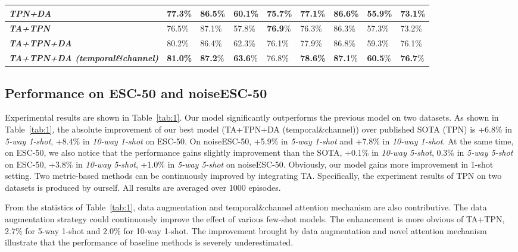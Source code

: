 \documentclass[a4paper]{article}
\begin{document}
\begin{table}[t]
{\begin{tabular}{l|l|l|l|l|l|l|l|l}
		\midrule
		{\textbf{\textit{TPN+DA}}} & 77.3\%  & 86.5\%  & 60.1\%  & 75.7\% & 77.1\% & 86.6\% & 55.9\%  & 73.1\%  \\
		\midrule
		{\textbf{\textit{TA+TPN}}} & 76.5\%  & 87.1\%  & 57.8\%  & \textbf{76.9}\% & 76.3\% & 86.3\% & 57.3\%  & 73.2\%  \\
		\midrule
		{\textbf{\textit{TA+TPN+DA}}} & 80.2\%  & 86.4\%  & 62.3\%  & 76.1\% & 77.9\%  & 86.8\%  & 59.3\%  & 76.1\%  \\
		\midrule
		{\textbf{\textit{TA+TPN+DA (temporal\&channel)}}} & \textbf{81.0\%}  & \textbf{87.2}\%  & \textbf{63.6}\%  & 76.8\% & \textbf{78.6\%}  & \textbf{87.1}\%  & \textbf{60.5}\%  & \textbf{76.7}\%  \\
		\bottomrule
		\end{tabular}
	}
\vspace{-2mm}
\end{table}

\vspace{-1mm}
\subsection{Performance on ESC-50 and noiseESC-50}
\vspace{-1mm}
Experimental results are shown in Table~\ref{tab:1}. Our model significantly outperforms the previous model on two datasets. As shown in Table~\ref{tab:1}, the absolute improvement of our best model (TA+TPN+DA (temporal\&channel)) over published SOTA (TPN) is +6.8\% in \textit{5-way 1-shot}, +8.4\% in \textit{10-way 1-shot} on ESC-50. On noiseESC-50, +5.9\% in \textit{5-way 1-shot} and +7.8\% in \textit{10-way 1-shot}.
At the same time, on ESC-50, we also notice that the performance gains slightly improvement than the SOTA, +0.1\% in \textit{10-way 5-shot}, 0.3\% in \textit{5-way 5-shot} on ESC-50, +3.8\% in \textit{10-way 5-shot}, +1.0\% in \textit{5-way 5-shot} on noiseESC-50.
Obviously, our model gains more improvement in 1-shot setting. Two metric-based methods can be continuously improved by integrating TA.
Specifically, the experiment results of TPN on two datasets is produced by ourself. All results are averaged over 1000 episodes.

From the statistics of Table~\ref{tab:1}, data augmentation 
and temporal\&channel attention mechanism are also contributive. 
The data augmentation strategy could continuously improve the effect of various few-shot models. The enhancement is more obvious of TA+TPN, 2.7\% for 5-way 1-shot and 2.0\% for 10-way 1-shot. The improvement brought by data augmentation and novel attention mechanism illustrate that the performance of baseline methods is severely underestimated.
\vspace{-2mm}
\end{document}
